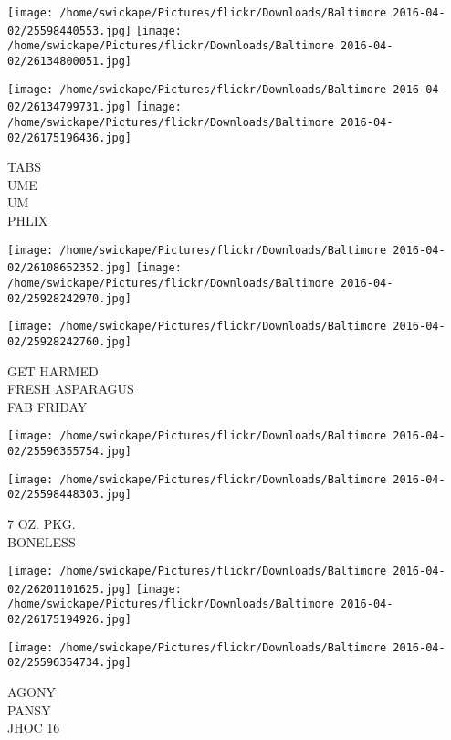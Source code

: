 \documentclass[10pt,letterpaper]{article}
\begin{document}
\texttt{[image: /home/swickape/Pictures/flickr/Downloads/Baltimore 2016-04-02/25598440553.jpg]}
\texttt{[image: /home/swickape/Pictures/flickr/Downloads/Baltimore 2016-04-02/26134800051.jpg]}

\texttt{[image: /home/swickape/Pictures/flickr/Downloads/Baltimore 2016-04-02/26134799731.jpg]}
\texttt{[image: /home/swickape/Pictures/flickr/Downloads/Baltimore 2016-04-02/26175196436.jpg]}

TABS\\
UME\\
UM\\
PHLIX\\
\pagebreak

\texttt{[image: /home/swickape/Pictures/flickr/Downloads/Baltimore 2016-04-02/26108652352.jpg]}
\texttt{[image: /home/swickape/Pictures/flickr/Downloads/Baltimore 2016-04-02/25928242970.jpg]}

\texttt{[image: /home/swickape/Pictures/flickr/Downloads/Baltimore 2016-04-02/25928242760.jpg]}

GET HARMED\\
FRESH ASPARAGUS\\
FAB FRIDAY\\
\pagebreak

\texttt{[image: /home/swickape/Pictures/flickr/Downloads/Baltimore 2016-04-02/25596355754.jpg]}

\vspace{0.25in}
\texttt{[image: /home/swickape/Pictures/flickr/Downloads/Baltimore 2016-04-02/25598448303.jpg]}

7 OZ. PKG.\\
BONELESS\\
\pagebreak

\texttt{[image: /home/swickape/Pictures/flickr/Downloads/Baltimore 2016-04-02/26201101625.jpg]}
\texttt{[image: /home/swickape/Pictures/flickr/Downloads/Baltimore 2016-04-02/26175194926.jpg]}

\vspace{0.25in}
\texttt{[image: /home/swickape/Pictures/flickr/Downloads/Baltimore 2016-04-02/25596354734.jpg]}

AGONY\\
PANSY\\
JHOC 16\\
\pagebreak
\end{document}
